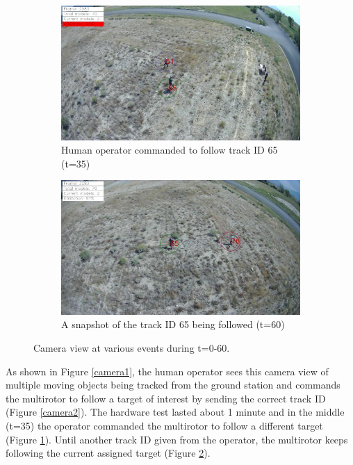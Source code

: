\documentclass[letterpaper, 10 pt, conference]{ieeeconf}  %
\begin{document}
\begin{figure}[!htbp]
	\begin{subfigure}{\columnwidth}
		\centering
		\includegraphics[width=\scalefactor]{ID65_follow_begin.png}
		\caption{Human operator commanded to follow track ID 65 (t=35)}
		\label{camera4}
	\end{subfigure}
		
	\begin{subfigure}{\columnwidth}
		\centering
		\includegraphics[width=\scalefactor]{ID65_following.png}
		\caption{A snapshot of the track ID 65 being followed (t=60)}
		\label{camera5}
	\end{subfigure}
	
	\caption{Camera view at various events during t=0-60.}
	\label{camera}
\end{figure}

As shown in Figure \ref{camera1}, the human operator sees this camera view of multiple moving objects being tracked from the ground station and commands the multirotor to follow a target of interest by sending the correct track ID (Figure \ref{camera2}). The hardware test lasted about 1 minute and in the middle (t=35) the operator commanded the multirotor to follow a different target (Figure \ref{camera4}). Until another track ID given from the operator, the multirotor keeps following the current assigned target (Figure \ref{camera5}).
\end{document}

